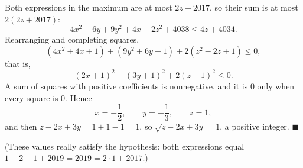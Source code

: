 Both expressions in the maximum are at most $2z+2017$, so their sum is at most $2(2z+2017)$:
\[4x^2+6y+9y^2+4x+2z^2+4038\le4z+4034 .\]
Rearranging and completing squares,
\[\left(4x^2+4x+1\right)+\left(9y^2+6y+1\right)+2\left(z^2-2z+1\right)\le0,\]
that is,
\[(2x+1)^2+(3y+1)^2+2(z-1)^2\le0 .\]
A sum of squares with positive coefficients is nonnegative, and it is $0$ only when every square is $0$. Hence
\[x=-\dfrac{1}{2},\qquad y=-\dfrac{1}{3},\qquad z=1,\]
and then $z-2x+3y=1+1-1=1$, so $\sqrt{z-2x+3y}=\boxed{1}$, a positive integer. $\blacksquare$

(These values really satisfy the hypothesis: both expressions equal $1-2+1+2019=2019=2\cdot1+2017$.)
